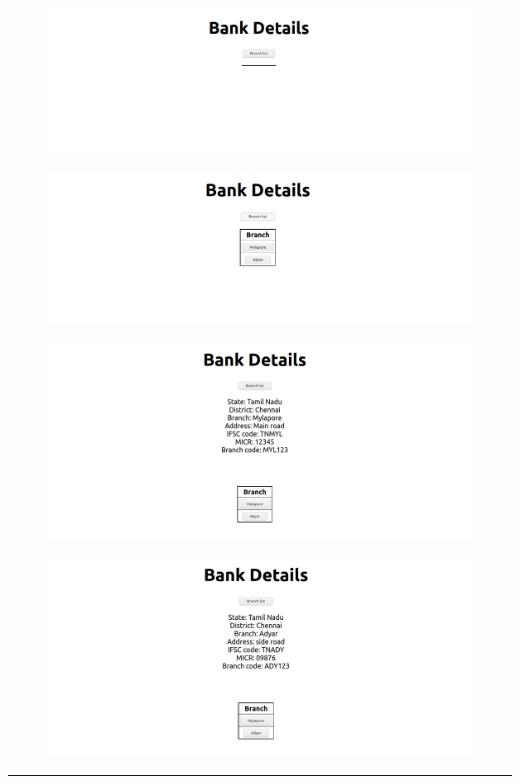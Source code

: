 \documentclass[12pt,letterpaper]{article}
\begin{document}
\subsection*{}
\begin{figure}[h]
    \centering
    \includegraphics[width = \textwidth]{Pics/op1.png}
\end{figure}
\begin{figure}[h!]
    \centering
    \includegraphics[width = \textwidth]{Pics/op2.png}
\end{figure}
\newpage
\begin{figure}[h!]
    \centering
    \includegraphics[width = \textwidth]{Pics/op3.png}
\end{figure}
\begin{figure}[h!]
    \centering
    \includegraphics[width = \textwidth]{Pics/op4.png}
\end{figure}

\hrule
\end{document}
